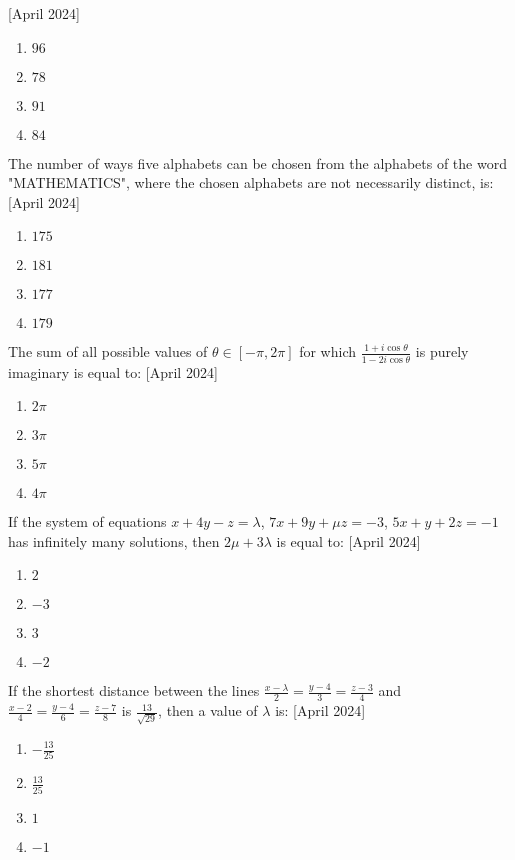     \hfill{[April 2024]}
    \begin{enumerate}
        \item $96$
        \item $78$
        \item $91$
        \item $84$
    \end{enumerate}
    \item The number of ways five alphabets can be chosen from the alphabets of the word "MATHEMATICS", where the chosen alphabets are not necessarily distinct, is:
    \hfill{[April 2024]}
    \begin{enumerate}
        \item $175$
        \item $181$
        \item $177$
        \item $179$
    \end{enumerate}
    \item The sum of all possible values of $\theta \in [-\pi, 2\pi]$ for which $\frac{1 + i\cos \theta}{1 - 2i\cos \theta}$ is purely imaginary is equal to:
    \hfill{[April 2024]}
    \begin{enumerate}
        \item $2\pi$
        \item $3\pi$
        \item $5\pi$
        \item $4\pi$
    \end{enumerate}
    \item If the system of equations $x + 4y - z = \lambda$, $7x + 9y + \mu z = -3$, $5x + y + 2z = -1$ has infinitely many solutions, then $2\mu + 3\lambda$ is equal to:
    \hfill{[April 2024]}
    \begin{enumerate}
        \item $2$
        \item $-3$
        \item $3$
        \item $-2$
    \end{enumerate}
    \item If the shortest distance between the lines $\frac{x - \lambda}{2} = \frac{y - 4}{3} = \frac{z - 3}{4}$ and $\frac{x - 2}{4} = \frac{y - 4}{6} = \frac{z - 7}{8}$ is $\frac{13}{\sqrt{29}}$, then a value of $\lambda$ is:
    \hfill{[April 2024]}
    \begin{enumerate}
        \item $-\frac{13}{25}$
        \item $\frac{13}{25}$
        \item $1$
        \item $-1$
    \end{enumerate}
